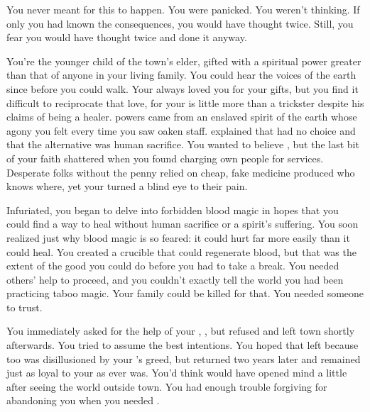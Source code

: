 \documentclass[char]{Pestilence}
\begin{document}
\name{\cRebel{}}

You never meant for this to happen. You were panicked. You weren't thinking. If only you had known the consequences, you would have thought twice. Still, you fear you would have thought twice and done it anyway.

You're the younger child of the town's elder, gifted with a spiritual power greater than that of anyone in your living family. You could hear the voices of the earth since before you could walk. Your \cElder{\parent} always loved you for your gifts, but you find it difficult to reciprocate that love, for your \cElder{\parent} is little more than a trickster despite his claims of being a healer. \cElder{\Their} powers came from an enslaved spirit of the earth whose agony you felt every time you saw \cElder{\their} oaken staff. \cElder{\They} explained that \cElder{\they} had no choice and that the alternative was human sacrifice. You wanted to believe \cElder{\them}, but the last bit of your faith shattered when you found \cElder{\them} charging \cElder{\their} own people for \cElder{\their} services. Desperate folks without the penny relied on cheap, fake medicine produced who knows where, yet your \cElder{\parent} turned a blind eye to their pain. 

Infuriated, you began to delve into forbidden blood magic in hopes that you could find a way to heal without human sacrifice or a spirit's suffering. You soon realized just why blood magic is so feared: it could hurt far more easily than it could heal. You created a crucible that could regenerate blood, but that was the extent of the good you could do before you had to take a break. You needed others' help to proceed, and you couldn't exactly tell the world you had been practicing taboo magic. Your family could be killed for that. You needed someone to trust.  

You immediately asked for the help of your \cApprentice{\sibling}, \cApprentice{}, but \cApprentice{\they} refused and left town shortly afterwards. You tried to assume the best intentions. You hoped that \cApprentice{} left because \cApprentice{\they} too was disillusioned by your \cElder{\parent}'s greed, but \cApprentice{\they} returned two years later and remained just as loyal to your \cElder{\parent} as \cApprentice{\they} ever was. You'd think \cApprentice{} would have opened \cApprentice{\their} mind a little after seeing the world outside town. You had enough trouble forgiving \cApprentice{\them} for abandoning you when you needed \cApprentice{\them}. 
\end{document}

